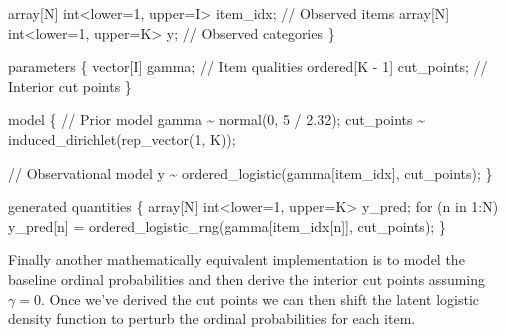 \documentclass[
  letterpaper,
  DIV=11,
  numbers=noendperiod]{scrartcl}
\newenvironment{Shaded}{\begin{snugshade}}{\end{snugshade}}
\newcommand{\CommentTok}[1]{\textcolor[rgb]{0.37,0.37,0.37}{#1}}
\newcommand{\ControlFlowTok}[1]{\textcolor[rgb]{0.00,0.23,0.31}{#1}}
\newcommand{\DataTypeTok}[1]{\textcolor[rgb]{0.68,0.00,0.00}{#1}}
\newcommand{\DecValTok}[1]{\textcolor[rgb]{0.68,0.00,0.00}{#1}}
\newcommand{\FloatTok}[1]{\textcolor[rgb]{0.68,0.00,0.00}{#1}}
\newcommand{\KeywordTok}[1]{\textcolor[rgb]{0.00,0.23,0.31}{#1}}
\newcommand{\NormalTok}[1]{\textcolor[rgb]{0.00,0.23,0.31}{#1}}
\begin{document}
\begin{codelisting}
\begin{Shaded}
\begin{Highlighting}[]
  \DataTypeTok{array}\NormalTok{[N] }\DataTypeTok{int}\NormalTok{\textless{}}\KeywordTok{lower}\NormalTok{=}\DecValTok{1}\NormalTok{, }\KeywordTok{upper}\NormalTok{=I\textgreater{} item\_idx; }\CommentTok{// Observed items}
  \DataTypeTok{array}\NormalTok{[N] }\DataTypeTok{int}\NormalTok{\textless{}}\KeywordTok{lower}\NormalTok{=}\DecValTok{1}\NormalTok{, }\KeywordTok{upper}\NormalTok{=K\textgreater{} y;        }\CommentTok{// Observed categories}
\NormalTok{\}}

\KeywordTok{parameters}\NormalTok{ \{}
  \DataTypeTok{vector}\NormalTok{[I] gamma;           }\CommentTok{// Item qualities}
  \DataTypeTok{ordered}\NormalTok{[K {-} }\DecValTok{1}\NormalTok{] cut\_points; }\CommentTok{// Interior cut points}
\NormalTok{\}}

\KeywordTok{model}\NormalTok{ \{}
  \CommentTok{// Prior model}
\NormalTok{  gamma \textasciitilde{} normal(}\DecValTok{0}\NormalTok{, }\DecValTok{5}\NormalTok{ / }\FloatTok{2.32}\NormalTok{);}
\NormalTok{  cut\_points \textasciitilde{} induced\_dirichlet(rep\_vector(}\DecValTok{1}\NormalTok{, K));}

  \CommentTok{// Observational model}
\NormalTok{  y \textasciitilde{} ordered\_logistic(gamma[item\_idx], cut\_points);}
\NormalTok{\}}

\KeywordTok{generated quantities}\NormalTok{ \{}
  \DataTypeTok{array}\NormalTok{[N] }\DataTypeTok{int}\NormalTok{\textless{}}\KeywordTok{lower}\NormalTok{=}\DecValTok{1}\NormalTok{, }\KeywordTok{upper}\NormalTok{=K\textgreater{} y\_pred;}
  \ControlFlowTok{for}\NormalTok{ (n }\ControlFlowTok{in} \DecValTok{1}\NormalTok{:N)}
\NormalTok{    y\_pred[n] = ordered\_logistic\_rng(gamma[item\_idx[n]], cut\_points);}
\NormalTok{\}}
\end{Highlighting}
\end{Shaded}

\end{codelisting}

Finally another mathematically equivalent implementation is to model the
baseline ordinal probabilities and then derive the interior cut points
assuming \(\gamma = 0\). Once we've derived the cut points we can then
shift the latent logistic density function to perturb the ordinal
probabilities for each item.
\end{document}
